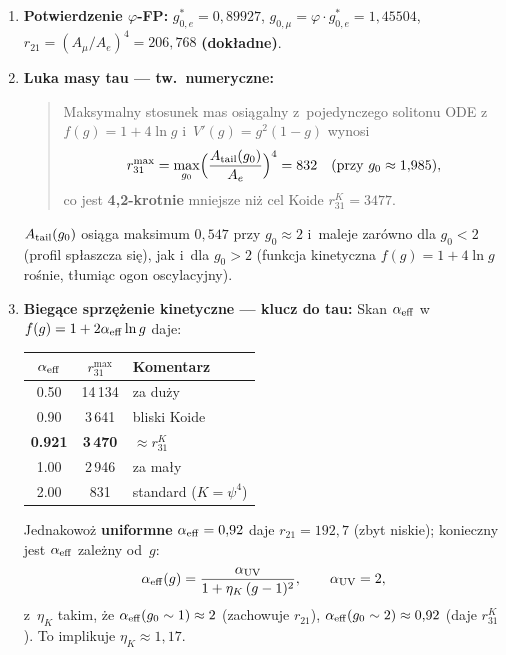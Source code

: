 \begin{enumerate}
  \item \textbf{Potwierdzenie $\varphi$-FP:}
    $g_{0,e}^* = 0{,}89927$,\quad
    $g_{0,\mu} = \varphi\cdot g_{0,e}^* = 1{,}45504$,\quad
    $r_{21} = (A_\mu/A_e)^4 = 206{,}768$ \textbf{(dok\l{}adne)}.

  \item \textbf{Luka masy tau --- tw.\ numeryczne:}
    \begin{quote}
      Maksymalny stosunek mas osi\k{a}galny z~pojedynczego solitonu
      ODE z~$f(g)=1+4\ln g$ i~$V'(g)=g^2(1-g)$ wynosi
      \begin{equation}\label{eq:r31-max}
        r_{31}^{\max}
        = \max_{g_0}\Bigl(\frac{A_{\rm tail}(g_0)}{A_e}\Bigr)^4
        = 832 \quad (\text{przy } g_0 \approx 1{,}985),
      \end{equation}
      co jest \textbf{4{,}2-krotnie} mniejsze ni\.z cel Koide
      $r_{31}^K = 3477$.
    \end{quote}
    $A_{\rm tail}(g_0)$ osi\k{a}ga maksimum $0{,}547$ przy $g_0\approx2$
    i~maleje zarówno dla $g_0 < 2$ (profil sp\l{}aszcza si\k{e}),
    jak i~dla $g_0 > 2$ (funkcja kinetyczna $f(g)=1+4\ln g$ ro\'snie,
    t\l{}umi\k{a}c ogon oscylacyjny).

  \item \textbf{Bieg\k{a}ce sprz\k{e}\.zenie kinetyczne
    --- klucz do tau:}
    Skan $\alpha_{\rm eff}$ w~$f(g)=1+2\alpha_{\rm eff}\ln g$ daje:
    \begin{center}\small
    \begin{tabular}{ccl}
    \toprule
    $\alpha_{\rm eff}$ & $r_{31}^{\max}$ & Komentarz \\ \midrule
    0.50 & 14\,134 & za du\.zy \\
    0.90 & 3\,641  & bliski Koide \\
    \textbf{0.921} & \textbf{3\,470} & \textbf{$\approx r_{31}^K$} \\
    1.00 & 2\,946  & za ma\l{}y \\
    2.00 & 831     & standard ($K=\psi^4$) \\
    \bottomrule
    \end{tabular}
    \end{center}
    Jednakowo\.z \textbf{uniformne} $\alpha_{\rm eff}=0{,}92$
    daje $r_{21}=192{,}7$ (zbyt niskie);
    konieczny jest $\alpha_{\rm eff}$ zale\.zny od~$g$:
    \begin{equation}\label{eq:alpha-eff-running}
      \alpha_{\rm eff}(g)
      = \frac{\alpha_{\rm UV}}{1 + \eta_K\,(g-1)^2},
      \qquad \alpha_{\rm UV} = 2,
    \end{equation}
    z~$\eta_K$ takim, \.ze
    $\alpha_{\rm eff}(g_0 \sim 1) \approx 2$ (zachowuje $r_{21}$),
    $\alpha_{\rm eff}(g_0 \sim 2) \approx 0{,}92$ (daje $r_{31}^K$).
    To implikuje $\eta_K \approx 1{,}17$.


\end{enumerate}
